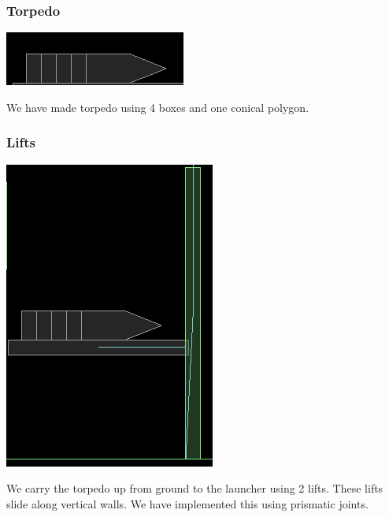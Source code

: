\documentclass[11pt]{article}
\begin{document}
\subsubsection{Torpedo}
\begin{center}
 \includegraphics[scale=0.5]{./images/torpedo}
 \end{center}
We have made torpedo using 4 boxes and one conical polygon.
\subsubsection{Lifts}
\begin{center}
 \includegraphics[scale=0.5]{./images/lift}
 \end{center}
We carry the torpedo up from ground to the launcher using 2 lifts. These lifts
slide along vertical walls. We have implemented this using prismatic joints.
\end{document}
